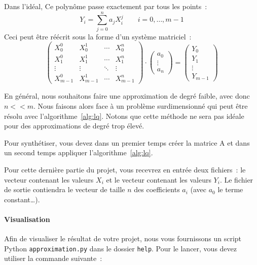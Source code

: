 \documentclass[a4paper, 12pt]{article}
\begin{document}
\noindent Dans l'idéal, Ce polynôme passe exactement par tous les points~:
\begin{equation*}
    Y_i = \sum_{j=0}^{n} a_j X_i^j \qquad i = 0, \dots, m-1
\end{equation*}
Ceci peut être réécrit sous la forme d'un système matriciel~:
\begin{equation*}
    \begin{pmatrix} X_0^0 & X_0^1 & \cdots & X_0^n \\
                    X_1^0 & X_1^1 & \cdots & X_1^n \\
                    \vdots & \vdots & \ddots & \vdots \\
                    X_{m-1}^0 & X_{m-1}^1 & \cdots & X_{m-1}^n
    \end{pmatrix}
    \cdot
    \begin{pmatrix} a_0 \\ \vdots \\ a_n \end{pmatrix}
    =
    \begin{pmatrix} Y_0 \\ Y_1 \\ \vdots \\ Y_{m-1} \end{pmatrix}
\end{equation*}

\noindent En général, nous souhaitons faire une approximation de degré faible, avec donc $n << m$. Nous faisons alors face à un problème surdimensionné qui peut être résolu avec l'algorithme~\ref{alg:lq}. Notons que cette méthode ne sera pas idéale pour des approximations de degré trop élevé.

\noindent Pour synthétiser, vous devez dans un premier temps créer la matrice A et dans un second temps appliquer l'algorithme~\ref{alg:lq}.

\noindent Pour cette dernière partie du projet, vous recevrez en entrée deux fichiers~: le vecteur contenant les valeurs $X_i$ et le vecteur contenant les valeurs $Y_i$. Le fichier de sortie contiendra le vecteur de taille $n$ des coefficients $a_i$ (avec $a_0$ le terme constant\dots).

\paragraph{Visualisation} Afin de visualiser le résultat de votre projet, nous vous fournissons un script Python \texttt{approximation.py} dans le dossier \texttt{help}. Pour le lancer, vous devez utiliser la commande suivante~:
\end{document}
